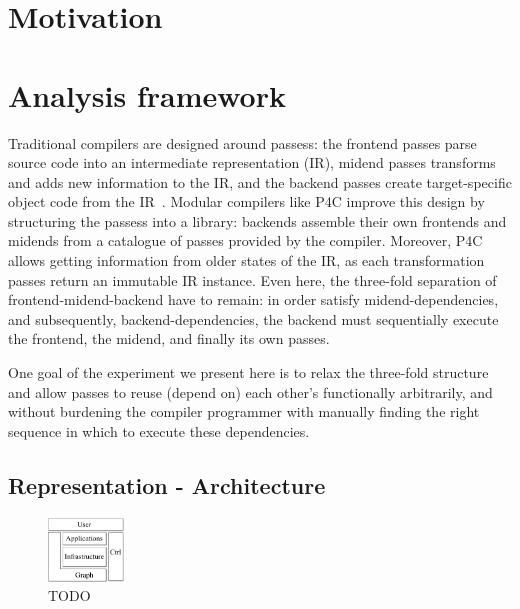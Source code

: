 \documentclass[sigconf]{acmart}
\begin{document}
	\section{Motivation}
	


\clearpage

	\section{Analysis framework}


Traditional compilers are designed around passess: the frontend passes parse source code into an intermediate representation (IR), midend passes transforms and adds new information to the IR, and the backend passes create target-specific object code from the IR~\cite{trad-compilers}.  
Modular compilers like P4C improve this design by structuring the passess into a library: backends assemble their own frontends and midends from a catalogue of passes provided by the compiler. Moreover, P4C allows getting information from older states of the IR, as each transformation passes return an immutable IR instance.
Even here, the three-fold separation of frontend-midend-backend have to remain: in order satisfy midend-dependencies, and subsequently, backend-dependencies, the backend must sequentially execute the frontend, the midend, and finally its own passes. 

One goal of the experiment we present here is to relax the three-fold structure and allow passes to reuse (depend on) each other's functionally arbitrarily, and without burdening the compiler programmer with manually finding the right sequence in which to execute these dependencies.

	\subsection{Representation - Architecture} %

  \begin{figure}
    \includegraphics[width=0.18\textwidth]{figures/arch-top.pdf}
    \caption{TODO}\label{fig:arch-top}
  \end{figure}
\end{document}
